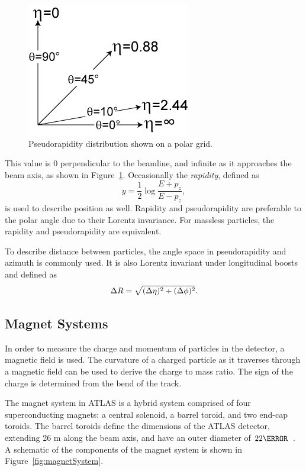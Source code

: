 \begin{figure}[!ht]
    \centering
    \includegraphics[width=.43\textwidth]{chapters/chapter2_experiment/images/Pseudorapidity2.png}
    \caption[Pseudorapidity distribution shown on a polar grid]{Pseudorapidity distribution shown on a polar grid.}
    \label{fig:pseudorapidity}
\end{figure}

This value is 0 perpendicular to the beamline, and infinite as it approaches the beam axis, as shown in Figure~\ref{fig:pseudorapidity}. Occasionally the \textit{rapidity}, defined as
%
\begin{equation}
    y = \frac{1}{2} \log{\frac{E+p_z}{E-p_z}},
\end{equation}
%
is used to describe position as well. Rapidity and pseudorapidity are preferable to the polar angle due to their Lorentz invariance. For massless particles, the rapidity and pseudorapidity are equivalent.

To describe distance between particles, the angle space in pseudorapidity and azimuth is commonly used. It is also Lorentz invariant under longitudinal boosts and defined as
\begin{equation}
    \Delta R = \sqrt{(\Delta\eta)^2 + (\Delta \phi)^2}.
\end{equation}
%

\subsection{Magnet Systems}\label{ssec:magnetsystem}
In order to measure the charge and momentum of particles in the detector, a magnetic field is used. The curvature of a charged particle as it traverses through a magnetic field can be used to derive the charge to mass ratio. The sign of the charge is determined from the bend of the track.

The magnet system in ATLAS is a hybrid system comprised of four superconducting magnets: a central solenoid, a barrel toroid, and two end-cap toroids. The barrel toroids define the dimensions of the ATLAS detector, extending 26 m along the beam axis, and have an outer diameter of $\unit{22}{\meter}$~\cite{magnet-system-tdr}. A schematic of the components of the magnet system is shown in Figure~\ref{fig:magnetSystem}.

